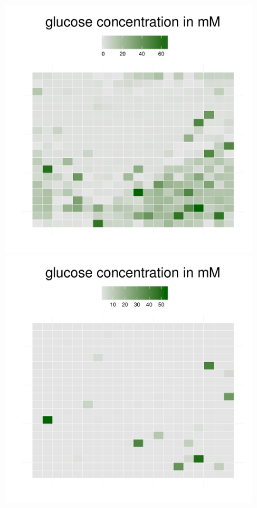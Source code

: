 \begin{figure}[h!]
{\begin{minipage}[t]{0.3\textwidth}
  \end{minipage}
  \begin{minipage}[t]{0.3\textwidth}
    \includegraphics[width=\textwidth]{../results/beijerinckii_20x20_seed943_gluc50.pdf}
  \end{minipage}
  \begin{minipage}[t]{0.3\textwidth}
    \includegraphics[width=\textwidth]{../results/beijerinckii_20x20_seed943_gluc65.pdf}

\end{minipage}}
\end{figure}
